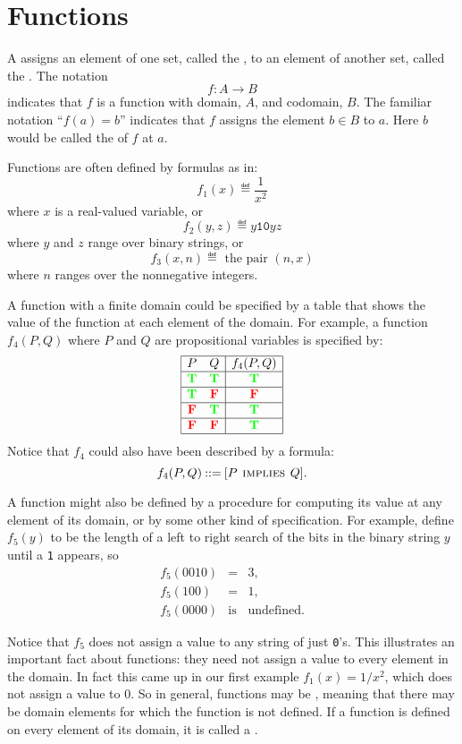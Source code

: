 \section{Functions}\label{funcsubsec}

A  assigns an element of one set, called the
, to an element of another set, called the .
The notation
\[
f: A \to B
\]
indicates that $f$ is a function with domain, $A$, and codomain, $B$.  The
familiar notation ``$f(a) = b$'' indicates that $f$ assigns the element $b
\in B$ to $a$.  Here $b$ would be called the  of $f$ at
 $a$.

Functions are often defined by formulas as in:
\[
f_1(x) \eqdef \frac{1}{x^2}
\]
where $x$ is a real-valued variable, or
\[
f_2(y,z) \eqdef y\mathtt{10}yz
\]
where $y$ and $z$ range over binary strings, or
\[
f_3(x, n) \eqdef \text{ the pair } (n, x)
\]
where $n$ ranges over the nonnegative integers.

A function with a finite domain could be specified by a table that shows
the value of the function at each element of the domain.  For example, a function
$f_4(P,Q)$ where $P$ and $Q$ are propositional variables is specified by:
\[\begin{array}{|cc|c|}
\hline
P & Q & f_4(P,Q)\\
\hline \textcolor{green}{\mathbf{T}} & \textcolor{green}{\mathbf{T}} & \textcolor{green}{\mathbf{T}}\\
\hline \textcolor{green}{\mathbf{T}} & \textcolor{red}{\mathbf{F}} & \textcolor{red}{\mathbf{F}}\\
\hline \textcolor{red}{\mathbf{F}} & \textcolor{green}{\mathbf{T}} & \textcolor{green}{\mathbf{T}}\\
\hline \textcolor{red}{\mathbf{F}} & \textcolor{red}{\mathbf{F}} & \textcolor{green}{\mathbf{T}}\\
\hline
\end{array}\]
Notice that $f_4$ could also have been described by a formula:
\[
f_4(P,Q)  \mathbin{::=} [P \mathbin{\mathrm{\textsc{\,implies\,}}} Q].
\]

A function might also be defined by a procedure for computing its value at
any element of its domain, or by some other kind of specification.  For
example, define $f_5(y)$ to be the length of a left to right search of the
bits in the binary string $y$ until a \texttt{1} appears, so
\begin{eqnarray*}
f_5(0010) & = &  3,\\
f_5(100)  & = & 1,\\
f_5(0000) & \text{is} & \text{undefined}.
\end{eqnarray*}

Notice that $f_5$ does not assign a value to any string of just \texttt{0}'s.
This illustrates an important fact about functions: they need not assign a
value to every element in the domain.  In fact this came up in our first
example $f_1(x)=1/x^2$, which does not assign a value to $0$.  So in
general, functions may be , meaning that there may be domain
elements for which the function is not defined.  If a function is defined
on every element of its domain, it is called a .

